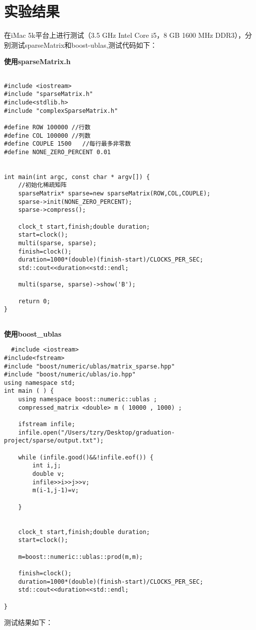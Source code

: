   \chapter{实验结果}
  在iMac 5k平台上进行测试（3.5 GHz Intel Core i5，8 GB 1600 MHz DDR3），分别测试sparseMatrix和boost-ublas,测试代码如下：
  
  \textbf{使用sparseMatrix.h}
  \begin{lstlisting}

#include <iostream>
#include "sparseMatrix.h"
#include<stdlib.h>
#include "complexSparseMatrix.h"

#define ROW 100000 //行数
#define COL 100000 //列数
#define COUPLE 1500   //每行最多非零数
#define NONE_ZERO_PERCENT 0.01


int main(int argc, const char * argv[]) {
    //初始化稀疏矩阵
    sparseMatrix* sparse=new sparseMatrix(ROW,COL,COUPLE);
    sparse->init(NONE_ZERO_PERCENT);
    sparse->compress();
  
    clock_t start,finish;double duration;
    start=clock();
    multi(sparse, sparse);
    finish=clock();
    duration=1000*(double)(finish-start)/CLOCKS_PER_SEC;
    std::cout<<duration<<std::endl;
    
    multi(sparse, sparse)->show('B');
    
    return 0;
}


\end{lstlisting}
\textbf{使用boost\_ublas}
\begin{lstlisting}
  #include <iostream>
#include<fstream>
#include "boost/numeric/ublas/matrix_sparse.hpp"
#include "boost/numeric/ublas/io.hpp"
using namespace std;
int main ( ) {
    using namespace boost::numeric::ublas ;
    compressed_matrix <double> m ( 10000 , 1000) ;
    
    ifstream infile;
    infile.open("/Users/tzry/Desktop/graduation-project/sparse/output.txt");
    
    while (infile.good()&&!infile.eof()) {
        int i,j;
        double v;
        infile>>i>>j>>v;
        m(i-1,j-1)=v;
        
    }
    
    
    clock_t start,finish;double duration;
    start=clock();

    m=boost::numeric::ublas::prod(m,m);
    
    finish=clock();
    duration=1000*(double)(finish-start)/CLOCKS_PER_SEC;
    std::cout<<duration<<std::endl;

}
\end{lstlisting}
 测试结果如下：

